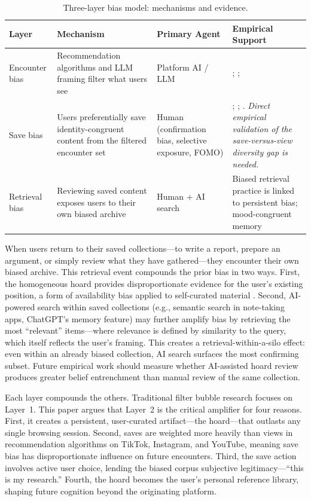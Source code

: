 \documentclass[12pt,a4paper]{article}
\begin{document}
\begin{table}[ht]
\centering
\caption{Three-layer bias model: mechanisms and evidence.}
\label{tab:three-layer}
\small
\begin{tabularx}{\textwidth}{l X l X}
\toprule
Layer & Mechanism & Primary Agent & Empirical Support \\
\midrule
Encounter bias & Recommendation algorithms and LLM framing filter what users see & Platform AI / LLM & \citet{GonzalezBailon2023}; \citet{Anwar2024}; \citet{Areeb2023} \\
\addlinespace
Save bias & Users preferentially save identity-congruent content from the filtered encounter set & Human (confirmation bias, selective exposure, FOMO) & \citet{Bai2025}; \citet{Wang2023}; \citet{Wu2023}. \emph{Direct empirical validation of the save-versus-view diversity gap is needed.} \\
\addlinespace
Retrieval bias & Reviewing saved content exposes users to their own biased archive & Human + AI search & Biased retrieval practice is linked to persistent bias; mood-congruent memory \\
\bottomrule
\end{tabularx}
\end{table}

When users return to their saved collections---to write a report, prepare an argument, or simply review what they have gathered---they encounter their own biased archive.
This retrieval event compounds the prior bias in two ways.
First, the homogeneous hoard provides disproportionate evidence for the user's existing position, a form of availability bias applied to self-curated material \citep{Tversky1973}.
Second, AI-powered search within saved collections (e.g., semantic search in note-taking apps, ChatGPT's memory feature) may further amplify bias by retrieving the most ``relevant'' items---where relevance is defined by similarity to the query, which itself reflects the user's framing.
This creates a retrieval-within-a-silo effect: even within an already biased collection, AI search surfaces the most confirming subset.
Future empirical work should measure whether AI-assisted hoard review produces greater belief entrenchment than manual review of the same collection.

Each layer compounds the others.
Traditional filter bubble research focuses on Layer~1.
This paper argues that Layer~2 is the critical amplifier for four reasons.
First, it creates a persistent, user-curated artifact---the hoard---that outlasts any single browsing session.
Second, saves are weighted more heavily than views in recommendation algorithms on TikTok, Instagram, and YouTube, meaning save bias has disproportionate influence on future encounters.
Third, the save action involves active user choice, lending the biased corpus subjective legitimacy---``this is my research.''
Fourth, the hoard becomes the user's personal reference library, shaping future cognition beyond the originating platform.
\end{document}
